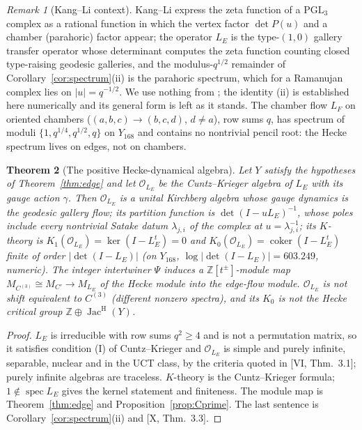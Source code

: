 \documentclass[11pt]{amsart}
\numberwithin{equation}{section}
\newtheorem{theorem}{Theorem}[section]
\theoremstyle{definition}
\theoremstyle{remark}
\newtheorem{remark}[theorem]{Remark}
\newcommand{\Z}{\mathbb{Z}}
\newcommand{\cO}{\mathcal{O}}
\newcommand{\Jac}{\operatorname{Jac}}
\newcommand{\coker}{\operatorname{coker}}
\newcommand{\spec}{\operatorname{spec}}
\newcommand{\PGL}{\mathrm{PGL}}
\newcommand{\JacH}{\Jac^{\mathrm{H}}}
\newcommand{\Cthree}{C^{(3)}}
\newcommand{\LE}{L_{E}}
\newcommand{\LF}{L_{F}}
\begin{document}
\begin{remark}[Kang--Li context]\label{rem:KL}
Kang--Li \cite{KL} express the zeta function of a $\PGL_3$ complex as a rational function
in which the vertex factor $\det P(u)$ and a chamber (parahoric) factor appear; the operator
$\LE$ is the type-$(1,0)$ gallery transfer operator whose determinant computes the zeta
function counting closed type-raising geodesic galleries, and the modulus-$q^{1/2}$
remainder of Corollary~\ref{cor:spectrum}(ii) is the parahoric spectrum, which for a
Ramanujan complex lies on $|u|=q^{-1/2}$. We use nothing from \cite{KL}; the identity (ii)
is established here numerically and its general form is left as it stands. The chamber
flow $\LF$ on oriented chambers ($(a,b,c)\to(b,c,d)$, $d\ne a$), row sums $q$, has spectrum
of moduli $\{1,q^{1/4},q^{1/2},q\}$ on $Y_{168}$ and contains no nontrivial pencil root: the
Hecke spectrum lives on edges, not on chambers.
\end{remark}

\begin{theorem}[The positive Hecke-dynamical algebra]\label{thm:algebra}
Let $Y$ satisfy the hypotheses of Theorem~\ref{thm:edge} and let $\cO_{\LE}$ be the
Cuntz--Krieger algebra of $\LE$ with its gauge action $\gamma$. Then $\cO_{\LE}$ is a unital
Kirchberg algebra whose gauge dynamics is the geodesic gallery flow; its partition
function is $\det(I-u\LE)^{-1}$, whose poles include every nontrivial Satake datum
$\lambda_{j,i}$ of the complex at $u=\lambda_{j,i}^{-1}$; its $K$-theory is
$K_1(\cO_{\LE})=\ker(I-\LE^{t})=0$ and $K_0(\cO_{\LE})=\coker(I-\LE^{t})$ finite of order
$|\det(I-\LE)|$ (on $Y_{168}$, $\log|\det(I-\LE)|=603.249$, numeric). The integer intertwiner
$\Psi$ induces a $\Z[t^{\pm}]$-module map $M_{\Cthree}\cong M_{C'}\to M_{\LE}$ of the Hecke
module into the edge-flow module. $\cO_{\LE}$ is not shift equivalent to $\Cthree$ (different
nonzero spectra), and its $K_0$ is not the Hecke critical group $\Z\oplus\JacH(Y)$.
\end{theorem}

\begin{proof}
$\LE$ is irreducible with row sums $q^{2}\ge4$ and is not a permutation matrix, so it
satisfies condition (I) of Cuntz--Krieger and $\cO_{\LE}$ is simple and purely infinite,
separable, nuclear and in the UCT class, by the criteria quoted in [VI, Thm.~3.1]; purely
infinite algebras are traceless. $K$-theory is the
Cuntz--Krieger formula; $1\notin\spec\LE$ gives the kernel statement and finiteness. The
module map is Theorem~\ref{thm:edge} and Proposition~\ref{prop:Cprime}. The last sentence is
Corollary~\ref{cor:spectrum}(ii) and [X, Thm.~3.3].
\end{proof}
\end{document}
